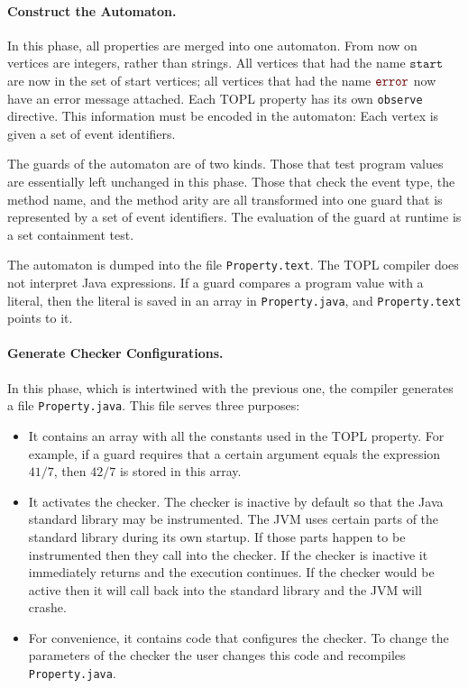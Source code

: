 \documentclass[10pt, preprint]{sigplanconf} %
\newcommand{\error}{\ensuremath{\textcolor{darkred}{\mathtt{error}}}\xspace}
\newcommand{\start}{\ensuremath{\mathtt{start}}\xspace}
\begin{document}
\paragraph{Construct the Automaton.}

In this phase, all properties are merged into one automaton.
From now on vertices are integers, rather than strings.
All vertices that had the name \start are now in the set of start vertices;
all vertices that had the name \error now have an error message attached.
Each TOPL property has its own {\tt observe} directive.
This information must be encoded in the automaton:
Each vertex is given a set of event identifiers.

The guards of the automaton are of two kinds.
Those that test program values are essentially left unchanged in this phase.
Those that check the event type, the method name, and the method arity are all transformed into one guard that is represented by a set of event identifiers.
The evaluation of the guard at runtime is a set containment test.

The automaton is dumped into the file {\tt Property.text}.
The TOPL compiler does not interpret Java expressions.
If a guard compares a program value with a literal, then the literal is saved in an array in {\tt Property.java}, and {\tt Property.text} points to it.

\paragraph{Generate Checker Configurations.}

In this phase, which is intertwined with the previous one, the compiler generates a file {\tt Property.java}.
This file serves three purposes:
\begin{itemize}
\item
It contains an array with all the constants used in the TOPL property.
For example, if a guard requires that a certain argument equals the expression~$41/7$, then $42/7$ is stored in this array.
\item
It activates the checker.
The checker is inactive by default so that the Java standard library may be instrumented.
The JVM uses certain parts of the standard library during its own startup.
If those parts happen to be instrumented then they call into the checker.
If the checker is inactive it immediately returns and the execution continues.
If the checker would be active then it will call back into the standard library and the JVM will crashe.
\item
For convenience, it contains code that configures the checker.
To change the parameters of the checker the user changes this code and recompiles {\tt Property.java}.
\end{itemize}
\end{document}
